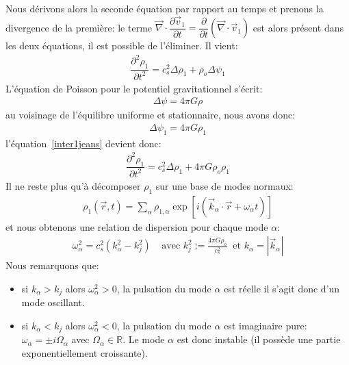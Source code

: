 Nous dérivons alors la seconde équation par rapport au temps et prenons la divergence de la première: le terme $\vec{\nabla}\cdot\dfrac
{\partial\vec{v}_{1}}{\partial t}=\dfrac{\partial}{\partial t}\left( \vec{\nabla}\cdot\vec{v}_{1}\right)$ est alors présent dans les deux équations,
il est possible de l'éliminer. Il vient:
\begin{align}
	\dfrac{\partial^{2}\rho_{1}}{\partial t^{2}}=c_{s}^{2}\Delta\rho_{1}+\rho_{o}\Delta\psi_{1}\label{inter1jeans}
\end{align}
L'équation de Poisson pour le potentiel gravitationnel s'écrit:
\begin{align*}
	\Delta\psi=4\pi G\rho
\end{align*}
au voisinage de l'équilibre uniforme et stationnaire, nous avons donc:
\begin{align*}
	\Delta\psi_{1}=4\pi G\rho_{1}%
\end{align*}
l'équation~\ref{inter1jeans} devient donc:
\begin{align*}
	\dfrac{\partial^{2}\rho_{1}}{\partial t^{2}}=c_{s}^{2}\Delta\rho_{1}+4\pi G\rho_{o}\rho_{1}
\end{align*}
Il ne reste plus qu'à décomposer $\rho_{1}$ sur une base de modes normaux:
\begin{align*}
	\rho_{1}\left(  \vec{r},t\right)  =\sum_{\alpha}\rho_{1,\alpha}\exp\left[i\left(  \vec{k}_{\alpha}\cdot\vec{r}+\omega_{\alpha}t\right)  \right]
\end{align*}
et nous obtenons une relation de dispersion pour chaque mode $\alpha$:
\begin{align*}
	\omega_{\alpha}^{2}=c_{s}^{2}\left(  k_{\alpha}^{2}-k_{j}^{2}\right)
	\ \ \ \ \ \text{avec }k_{j}^{2}:=\frac{4\pi G\rho_{o}}{c_{s}^{2}}\ \text{\ et
	\ }k_{\alpha}=\left\vert \vec{k}_{\alpha}\right\vert
\end{align*}
Nous remarquons que:
\begin{itemize}

	\item si $k_{\alpha}>k_{j}$ alors $\omega_{\alpha}^{2}>0$, la pulsation du mode $\alpha$ est réelle il s'agit donc d'un mode oscillant.

	\item si $k_{\alpha}<k_{j}$ alors $\omega_{\alpha}^{2}<0$, la pulsation du mode $\alpha$ est imaginaire pure: $\omega_{\alpha}=\pm
		i\Omega_{\alpha}$ avec $\Omega_{\alpha}\in\mathbb{R}$. Le mode $\alpha$ est donc instable (il possède une partie exponentiellement
		croissante).

\end{itemize}

